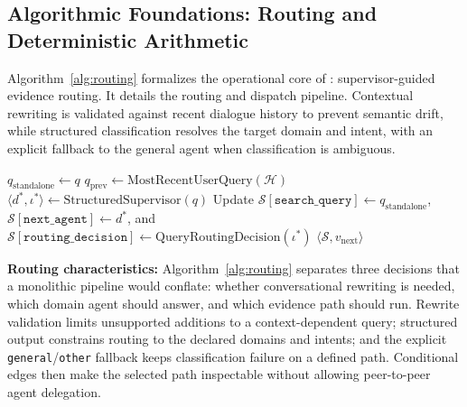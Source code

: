 \subsection{Algorithmic Foundations: Routing and Deterministic Arithmetic}
\label{sec:algorithms}

Algorithm~\ref{alg:routing} formalizes the operational core of \system{}: supervisor-guided evidence routing. It details the routing and dispatch pipeline. Contextual rewriting is validated against recent dialogue history to prevent semantic drift, while structured classification resolves the target domain and intent, with an explicit fallback to the general agent when classification is ambiguous.

\begin{algorithm}[!htbp]
\footnotesize
\SetAlFnt{\footnotesize}
\SetAlCapFnt{\footnotesize}
\SetAlCapNameFnt{\footnotesize}
\SetAlgoVlined
\LinesNumbered
\caption{Supervisor Routing and Conditional Evidence-Path Dispatch}
\label{alg:routing}
$q_{\text{standalone}} \leftarrow q$\;
$q_{\mathrm{prev}} \leftarrow \mathrm{MostRecentUserQuery}(\mathcal{H})$\;
$\langle d^*, \iota^* \rangle \leftarrow \mathrm{StructuredSupervisor}(q)$\;
Update $\mathcal{S}[\texttt{search\_query}] \leftarrow q_{\text{standalone}}$, $\mathcal{S}[\texttt{next\_agent}] \leftarrow d^*$, and $\mathcal{S}[\texttt{routing\_decision}] \leftarrow \mathrm{QueryRoutingDecision}(\iota^*)$\;
\Return $\langle \mathcal{S}, v_{\text{next}} \rangle$\;
\end{algorithm}

\textbf{Routing characteristics:}
Algorithm~\ref{alg:routing} separates three decisions that a monolithic pipeline would conflate: whether conversational rewriting is needed, which domain agent should answer, and which evidence path should run. Rewrite validation limits unsupported additions to a context-dependent query; structured output constrains routing to the declared domains and intents; and the explicit \texttt{general}/\texttt{other} fallback keeps classification failure on a defined path. Conditional edges then make the selected path inspectable without allowing peer-to-peer agent delegation.

